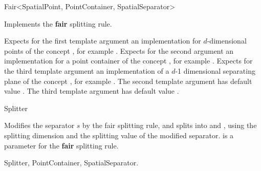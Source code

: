 

\begin{ccRefFunctionObjectClass}{Fair<SpatialPoint, PointContainer, SpatialSeparator>}  %


\ccDefinition
Implements the {\bf fair} splitting rule.

\ccParameters

Expects for the first template argument an implementation for
$d$-dimensional points of
the concept , 
for example . Expects for the second argument an implementation
for a point container of the concept , for example .
Expects for the third template argument an implementation of a $d$-1 dimensional 
separating plane of the concept , for example .
The second template argument has default value .
The third template argument has default value . 


\ccIsModel

Splitter

\ccTypes



\ccOperations

{Modifies the separator $s$ by the fair splitting rule, 
and splits  into  and ,
using the splitting dimension and the splitting value of the modified separator.
 is a parameter for the {\bf fair} splitting rule.
}

\ccSeeAlso

Splitter, PointContainer, SpatialSeparator.

\end{ccRefFunctionObjectClass}


